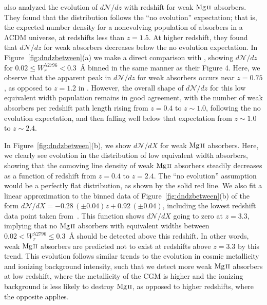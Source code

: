 \cite{Narayanan2007} also analyzed the evolution of $d\mathcal{N}\!/dz$ with redshift for weak ${\hbox{{\rm Mg}\kern 0.1em{\sc ii}}}$ absorbers. They found that the distribution follows the ``no evolution'' expectation; that is, the expected number density for a nonevolving population of absorbers in a $\mathrm{\Lambda CDM}$ universe, at redshifts less than $z = 1.5$. At higher redshift, they found that $d\mathcal{N}\!/dz$ for weak absorbers decreases below the no evolution expectation. In Figure~\ref{fig:dndzbetween}(a) we make a direct comparison with \cite{Narayanan2007}, showing $d\mathcal{N}\!/dz$ for $0.02 \le W_r^{\lambda2796} < 0.3$~{\AA} binned in the same manner as their Figure 4. Here, we observe that the apparent peak in $d\mathcal{N}\!/dz$ for weak absorbers occurs near $z = 0.75$, as opposed to $z = 1.2$ in \cite{Narayanan2007}. However, the overall shape of $d\mathcal{N}\!/dz$ for this low equivalent width population remains in good agreement, with the number of weak absorbers per redshift path length rising from $z = 0.4$ to $z \sim 1.0$, following the no evolution expectation, and then falling well below that expectation from $z \sim 1.0$ to $z \sim 2.4$.

In Figure~\ref{fig:dndzbetween}(b), we show $d\mathcal{N}\!/dX$ for weak ${\hbox{{\rm Mg}\kern 0.1em{\sc ii}}}$ absorbers. Here, we clearly see evolution in the distribution of low equivalent width absorbers, showing that the comoving line density of weak ${\hbox{{\rm Mg}\kern 0.1em{\sc ii}}}$ absorbers steadily decreases as a function of redshift from $z = 0.4$ to $z = 2.4$. The ``no evolution'' assumption would be a perfectly flat distribution, as shown by the solid red line. We also fit a linear approximation to the binned data of Figure~\ref{fig:dndzbetween}(b) of the form $d\mathcal{N}\!/dX = -0.28\,(\pm0.04) z + 0.92\,(\pm0.04)$, including the lowest redshift data point taken from~\cite{Narayanan2005}. This function shows $d\mathcal{N}\!/dX$ going to zero at $z = 3.3$, implying that no ${\hbox{{\rm Mg}\kern 0.1em{\sc ii}}}$ absorbers with equivalent widths between $0.02 < W_{r}^{\lambda2796} \le 0.3$~{\AA} should be detected above this redshift. In other words, weak ${\hbox{{\rm Mg}\kern 0.1em{\sc ii}}}$ absorbers are predicted not to exist at redshifts above $z = 3.3$ by this trend. This evolution follows similar trends to the evolution in cosmic metallicity and ionizing background intensity, such that we detect more weak ${\hbox{{\rm Mg}\kern 0.1em{\sc ii}}}$ absorbers at low redshift, where the metallicity of the CGM is higher and the ionizing background is less likely to destroy ${\hbox{{\rm Mg}\kern 0.1em{\sc ii}}}$, as opposed to higher redshifts, where the opposite applies.

